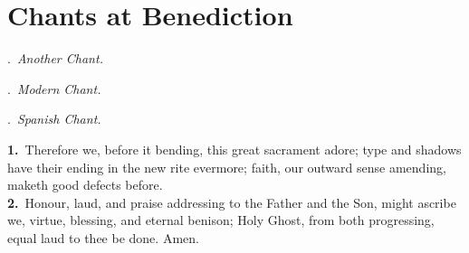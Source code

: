 {
\section{Chants at Benediction}
\def\gabcfolder{../BenedictionChants}

\let\translationmargin=\undefined
\bigskip




\bigskip
{.~\emph{Another Chant.}
\par
}
\medskip
{}


\bigskip
{.~\emph{Modern Chant.}
\par
}
\medskip


\bigskip
{.~\emph{Spanish Chant.}
\par
}
\medskip


\begin{multicols}{2}
\noindent
\textbf{1.}~Therefore we, before it bending,
this great sacrament adore;
type and shadows have their ending
in the new rite evermore;
faith, our outward sense amending,
maketh good defects before.\\
\textbf{2.}~Honour, laud, and praise addressing
to the Father and the Son,
might ascribe we, virtue, blessing,
and eternal benison;
Holy Ghost, from both progressing,
equal laud to thee be done. Amen.
\end{multicols}
\medskip

}
